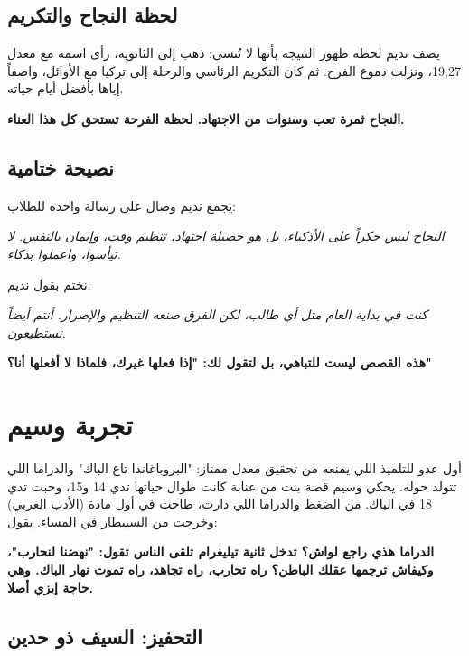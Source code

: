 \documentclass[12pt,a4paper]{book}
\newcommand{\quoteAr}[1]{%
	\begin{myquote}
		\itshape #1
	\end{myquote}
}
\newcommand{\importantAr}[1]{%
	\begin{important}
		\bfseries #1
	\end{important}
}
\begin{document}
	\subsection{لحظة النجاح والتكريم}
	يصف نديم لحظة ظهور النتيجة بأنها لا تُنسى: ذهب إلى الثانوية، رأى اسمه مع معدل 19,27، ونزلت دموع الفرح. ثم كان التكريم الرئاسي والرحلة إلى تركيا مع الأوائل، واصفاً إياها بأفضل أيام حياته.
	\importantAr{النجاح ثمرة تعب وسنوات من الاجتهاد. لحظة الفرحة تستحق كل هذا العناء.}
	
	\subsection{نصيحة ختامية}
	يجمع نديم وصال على رسالة واحدة للطلاب:
	\quoteAr{النجاح ليس حكراً على الأذكياء، بل هو حصيلة اجتهاد، تنظيم وقت، وإيمان بالنفس. لا تيأسوا، واعملوا بذكاء.}
	
	نختم بقول نديم: \quoteAr{كنت في بداية العام مثل أي طالب، لكن الفرق صنعه التنظيم والإصرار. أنتم أيضاً تستطيعون.}
	
	
	\importantAr{هذه القصص ليست للتباهي، بل لتقول لك: "إذا فعلها غيرك، فلماذا لا أفعلها أنا؟"}
	
	
	
	
	\section{تجربة وسيم}
	
	أول عدو للتلميذ اللي يمنعه من تحقيق معدل ممتاز: "البروباغاندا تاع الباك" والدراما اللي تتولد حوله. يحكي وسيم قصة بنت من عنابة كانت طوال حياتها تدي 14 و15، وحبت تدي 18 في الباك. من الضغط والدراما اللي دارت، طاحت في أول مادة (الأدب العربي) وخرجت من السبيطار في المساء. يقول:
	
	\importantAr{الدراما هذي راجع لواش؟ تدخل ثانية تيليغرام تلقى الناس تقول: "نهضنا لنحارب"،  وكيفاش ترجمها عقلك الباطن؟ راه تحارب، راه تجاهد، راه تموت نهار الباك. وهي حاجة إيزي أصلا.}
	
	\subsection{التحفيز: السيف ذو حدين}
	
\end{document}
